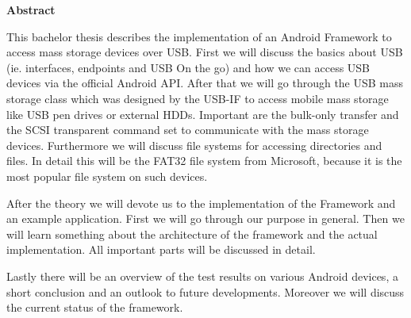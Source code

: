 

\clearemptydoublepage
{}
{}	





\vspace*{2cm}
\begin{center}
{\Large \bf Abstract}
\end{center}
\vspace{1cm}

This bachelor thesis describes the implementation of an Android Framework to access mass storage devices over USB. First we will discuss the basics about USB (ie. interfaces, endpoints and USB On the go) and how we can access USB devices via the official Android API. After that we will go through the USB mass storage class which was designed by the USB-IF to access mobile mass storage like USB pen drives or external HDDs. Important are the bulk-only transfer and the SCSI transparent command set to communicate with the mass storage devices. Furthermore we will discuss file systems for accessing directories and files. In detail this will be the FAT32 file system from Microsoft, because it is the most popular file system on such devices.

After the theory we will devote us to the implementation of the Framework and an example application. First we will go through our purpose in general. Then we will learn something about the architecture of the framework and the actual implementation. All important parts will be discussed in detail.

Lastly there will be an overview of the test results on various Android devices, a short conclusion and an outlook to future developments. Moreover we will discuss the current status of the framework. 